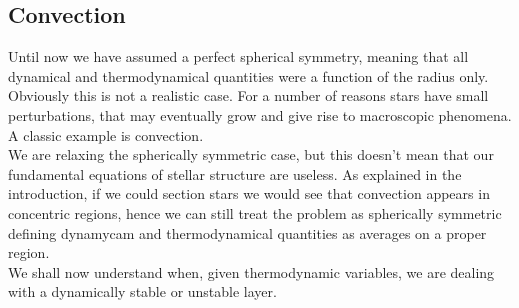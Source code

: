 \documentclass[11pt]{article}
\numberwithin{equation}{section}
\begin{document}
\subsection{Convection}
Until now we have assumed a perfect spherical symmetry, meaning that all dynamical and thermodynamical quantities were a function of the radius only. Obviously this is not a realistic case. For a number of reasons stars have small perturbations, that may eventually grow and give rise to macroscopic phenomena. A classic example is convection.\\
We are relaxing the spherically symmetric case, but this doesn't mean that our fundamental equations of stellar structure are useless. As explained in the introduction, if we could section stars we would see that convection appears in concentric regions, hence  we can still treat the problem as spherically symmetric defining dynamycam and thermodynamical quantities as averages on a proper region. \\
We shall now understand when, given thermodynamic variables, we are dealing with a dynamically stable or unstable layer.
\end{document}
